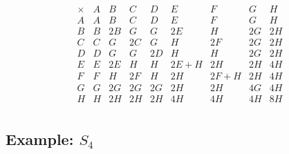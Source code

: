 \documentclass[11pt,oneside]{article}
\newcommand{\thinplus}{\!+\!}
\begin{document}


$$
\begin{array}{r|rrrrrrrr}
\times & A & B & C & D & E & F & G & H \\
\hline
A & A & B & C & D & E & F & G & H \\
B & B & 2B & G & G & 2E & H & 2G & 2H \\
C & C & G & 2C & G & H & 2F & 2G & 2H \\
D & D & G & G & 2D & H & H & 2G & 2H \\
E & E & 2E & H & H & 2E\thinplus H & 2H & 2H & 4H \\
F & F & H & 2F & H & 2H & 2F\thinplus H & 2H & 4H \\
G & G & 2G & 2G & 2G & 2H & 2H & 4G & 4H \\
H & H & 2H & 2H & 2H & 4H & 4H & 4H & 8H \\
\end{array}
$$


\subsection{Example: $S_4$}

\end{document}
